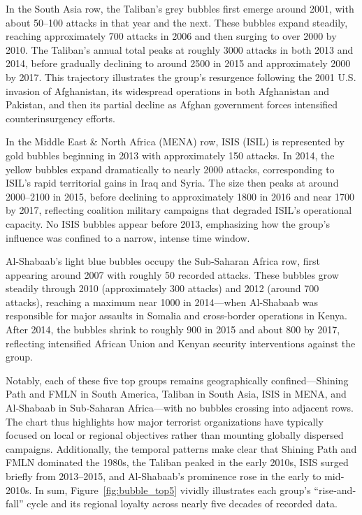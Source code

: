 In the South Asia row, the Taliban’s grey bubbles first emerge around 2001, with about 50–100 attacks in that year and the next. These bubbles expand steadily, reaching approximately 700 attacks in 2006 and then surging to over 2000 by 2010. The Taliban’s annual total peaks at roughly 3000 attacks in both 2013 and 2014, before gradually declining to around 2500 in 2015 and approximately 2000 by 2017. This trajectory illustrates the group’s resurgence following the 2001 U.S. invasion of Afghanistan, its widespread operations in both Afghanistan and Pakistan, and then its partial decline as Afghan government forces intensified counterinsurgency efforts.

In the Middle East \& North Africa (MENA) row, ISIS (ISIL) is represented by gold bubbles beginning in 2013 with approximately 150 attacks. In 2014, the yellow bubbles expand dramatically to nearly 2000 attacks, corresponding to ISIL’s rapid territorial gains in Iraq and Syria. The size then peaks at around 2000–2100 in 2015, before declining to approximately 1800 in 2016 and near 1700 by 2017, reflecting coalition military campaigns that degraded ISIL’s operational capacity. No ISIS bubbles appear before 2013, emphasizing how the group’s influence was confined to a narrow, intense time window.

Al-Shabaab’s light blue bubbles occupy the Sub‐Saharan Africa row, first appearing around 2007 with roughly 50 recorded attacks. These bubbles grow steadily through 2010 (approximately 300 attacks) and 2012 (around 700 attacks), reaching a maximum near 1000 in 2014—when Al‐Shabaab was responsible for major assaults in Somalia and cross‐border operations in Kenya. After 2014, the bubbles shrink to roughly 900 in 2015 and about 800 by 2017, reflecting intensified African Union and Kenyan security interventions against the group. 

Notably, each of these five top groups remains geographically confined—Shining Path and FMLN in South America, Taliban in South Asia, ISIS in MENA, and Al‐Shabaab in Sub‐Saharan Africa—with no bubbles crossing into adjacent rows. The chart thus highlights how major terrorist organizations have typically focused on local or regional objectives rather than mounting globally dispersed campaigns. Additionally, the temporal patterns make clear that Shining Path and FMLN dominated the 1980s, the Taliban peaked in the early 2010s, ISIS surged briefly from 2013–2015, and Al‐Shabaab’s prominence rose in the early to mid‐2010s. In sum, Figure~\ref{fig:bubble_top5} vividly illustrates each group’s “rise‐and‐fall” cycle and its regional loyalty across nearly five decades of recorded data.  
